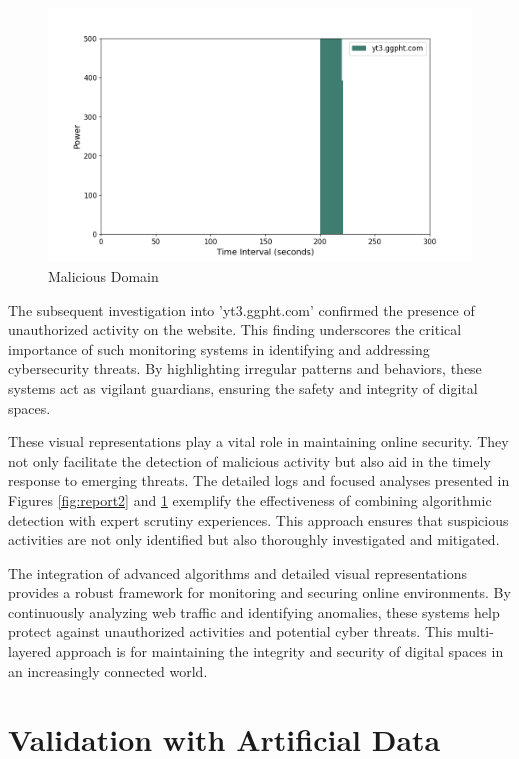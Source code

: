\begin{figure}
    \centering
    \includegraphics[width=\textwidth]{../Thesis_Docs/media/mal2s.png}
    \caption{Malicious Domain}
    \label{fig:malicious2}
\end{figure} 

The subsequent investigation into 'yt3.ggpht.com' confirmed the presence of unauthorized activity on the website. This finding underscores the critical importance of such monitoring systems in identifying and addressing cybersecurity threats. By highlighting irregular patterns and behaviors, these systems act as vigilant guardians, ensuring the safety and integrity of digital spaces. 

These visual representations play a vital role in maintaining online security. They not only facilitate the detection of malicious activity but also aid in the timely response to emerging threats. The detailed logs and focused analyses presented in Figures \ref{fig:report2} and \ref{fig:malicious2} exemplify the effectiveness of combining algorithmic detection with expert scrutiny experiences. This approach ensures that suspicious activities are not only identified but also thoroughly investigated and mitigated.

The integration of advanced algorithms and detailed visual representations provides a robust framework for monitoring and securing online environments. By continuously analyzing web traffic and identifying anomalies, these systems help protect against unauthorized activities and potential cyber threats. This multi-layered approach is  for maintaining the integrity and security of digital spaces in an increasingly connected world.

\section{Validation with Artificial Data}

